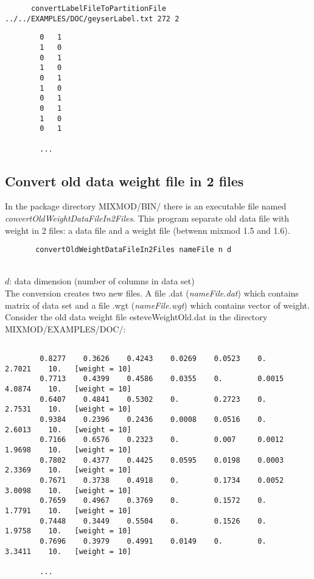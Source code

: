 {\scriptsize
\begin{verbatim}
      convertLabelFileToPartitionFile ../../EXAMPLES/DOC/geyserLabel.txt 272 2
\end{verbatim}}

{\scriptsize
\begin{verbatim}
        0   1
        1   0
        0   1
        1   0
        0   1
        1   0
        0   1
        0   1
        1   0
        0   1

        ...
\end{verbatim}}



\subsection{ Convert old data weight file in 2 files}
In the package directory MIXMOD/BIN/ there is an executable file named {\em
convertOldWeightDataFileIn2Files}. This program separate old data file with weight in 2 files: a data file and a
weight file (betwenn {\sc mixmod} 1.5 and 1.6).\\
{\scriptsize
\begin{verbatim}
       convertOldWeightDataFileIn2Files nameFile n d
\end{verbatim}}

\\
$d$: data dimension (number of columns in data set)\\
The conversion creates two new files. A file .dat ({\em nameFile.dat}) which contains matrix of data set and a
file .wgt ({\em nameFile.wgt}) which contains vector of weight.\\
Consider the old data weight file esteveWeightOld.dat in the directory MIXMOD/EXAMPLES/DOC/:
{\scriptsize
\begin{verbatim}

        0.8277    0.3626    0.4243    0.0269    0.0523    0.        2.7021    10.   [weight = 10]
        0.7713    0.4399    0.4586    0.0355    0.        0.0015    4.0874    10.   [weight = 10]
        0.6407    0.4841    0.5302    0.        0.2723    0.        2.7531    10.   [weight = 10]
        0.9384    0.2396    0.2436    0.0008    0.0516    0.        2.6013    10.   [weight = 10]
        0.7166    0.6576    0.2323    0.        0.007     0.0012    1.9698    10.   [weight = 10]
        0.7802    0.4377    0.4425    0.0595    0.0198    0.0003    2.3369    10.   [weight = 10]
        0.7671    0.3738    0.4918    0.        0.1734    0.0052    3.0098    10.   [weight = 10]
        0.7659    0.4967    0.3769    0.        0.1572    0.        1.7791    10.   [weight = 10]
        0.7448    0.3449    0.5504    0.        0.1526    0.        1.9758    10.   [weight = 10]
        0.7696    0.3979    0.4991    0.0149    0.        0.        3.3411    10.   [weight = 10]

        ...
\end{verbatim}}

